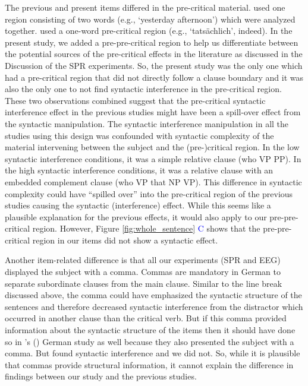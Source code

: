 \documentclass[review,preprint,12pt,authoryear,floatsintext]{elsarticle}
\begin{document}
{{The previous and present items differed in the pre-critical material. \citet{vandyke07} used one region consisting of two words (e.g., `yesterday afternoon') which were analyzed together. \cite{mertzen} used a one-word pre-critical region (e.g., `tatsächlich', indeed). In the present study, we added a pre-pre-critical region to help us differentiate between the potential sources of the pre-critical effects in the literature as discussed in the Discussion of the SPR experiments. So, the present study was the only one which had a pre-critical region that did not directly follow a clause boundary and it was also the only one to not find syntactic interference in the pre-critical region. These two observations combined suggest that the pre-critical syntactic interference effect in the previous studies might have been a spill-over effect from the syntactic manipulation. The syntactic interference manipulation in all the studies using this design was confounded with syntactic complexity of the material intervening between the subject and the (pre-)critical region. In the low syntactic interference conditions, it was a simple relative clause (who VP PP). In the high syntactic interference conditions, it was a relative clause with an embedded complement clause (who VP that NP VP). This difference in syntactic complexity could have ``spilled over'' into the pre-critical region of the previous studies causing the syntactic (interference) effect. While this seems like a plausible explanation for the previous effects, it would also apply to our pre-pre-critical region. However, Figure \ref{fig:whole_sentence} \textcolor{blue}{C} shows that the pre-pre-critical region in our items did not show a syntactic effect.

{Another item-related difference is that all our experiments (SPR and EEG) displayed the subject with a comma. Commas are mandatory in German to separate subordinate clauses from the main clause. Similar to the line break discussed above, the comma could have emphasized the syntactic structure of the sentences and therefore decreased syntactic interference from the distractor which occurred in another clause than the critical verb. But if this comma provided information about the syntactic structure of the items then it should have done so in \citeauthor{mertzen}'s (\citeyear{mertzen}) German study as well because they also presented the subject with a comma. But \citet{mertzen} found syntactic interference and we did not. So, while it is plausible that commas provide structural information, it cannot explain the difference in findings between our study and the previous studies.}\label{comma}

}}
\end{document}
